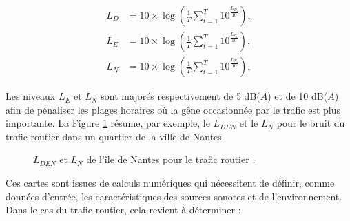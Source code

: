 \begin{subequations}
\begin{align}
L_D &= 10\times\log\left(\frac{1}{T} \sum_{t = 1}^{T}10^{\frac{L_{D_t}}{10}}\right),\\
L_E &= 10\times\log\left(\frac{1}{T} \sum_{t = 1}^{T}10^{\frac{L_{E_t}}{10}}\right),\\
L_N &= 10\times\log\left(\frac{1}{T} \sum_{t = 1}^{T}10^{\frac{L_{N_t}}{10}}\right).
\end{align}
\end{subequations}

Les niveaux $L_E$ et $L_N$ sont majorés respectivement de 5 dB($A$) et de 10 dB($A$) afin de pénaliser les plages horaires où la gêne occasionnée par le trafic est plus importante. La Figure \ref{fig:carto_nantes} résume, par exemple, le $L_{DEN}$ et le $L_N$ pour le bruit du trafic routier dans un quartier de la ville de Nantes.

\begin{figure}[t]
\centering
{}
\caption{$L_{DEN}$  et $L_N$  de l'île de Nantes pour le trafic routier \cite{nantes_carte}.}
\label{fig:carto_nantes}
\end{figure}


Ces cartes sont issues de calculs numériques qui nécessitent de définir, comme données d'entrée, les caractéristiques des sources sonores et de l'environnement.  Dans le cas du trafic routier, cela revient à déterminer :

